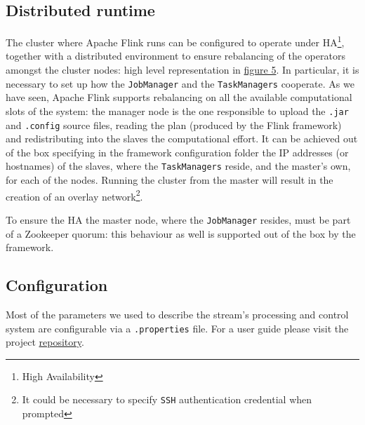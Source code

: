 \subsection{Distributed runtime}
The cluster where Apache Flink runs can be configured to operate under HA\footnote{High Availability}, together with a distributed environment to ensure rebalancing of the operators amongst the cluster nodes: high level representation in \hyperref[fig:ember_ha]{figure 5}. 
In particular, it is necessary to set up how the \texttt{JobManager} and the \texttt{TaskManagers} cooperate. As we have seen, Apache Flink supports rebalancing on all the available computational slots of the system: the manager node is the one responsible to upload the \texttt{.jar} and \texttt{.config} source files, reading the plan (produced by the Flink framework) and redistributing into the slaves the computational effort. It can be achieved out of the box specifying in the framework configuration folder the IP addresses (or hostnames) of the slaves, where the \texttt{TaskManagers} reside, and the master's own, for each of the nodes. Running the cluster from the master will result in the creation of an overlay network\footnote{It could be necessary to specify \texttt{SSH} authentication credential when prompted}.

To ensure the HA the master node, where the \texttt{JobManager} resides, must be part of a Zookeeper quorum: this behaviour as well is supported out of the box by the framework.

\subsection{Configuration}
Most of the parameters we used to describe the stream's processing and control system are configurable via a \texttt{.properties} file. For a user guide please visit the project \href{https://github.com/projectember/project-ember}{repository}.

